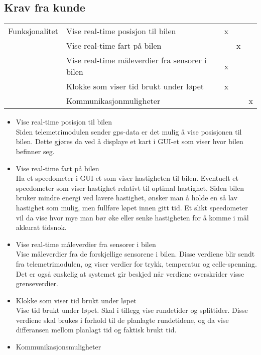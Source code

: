 \subsection{Krav fra kunde}
\begin{tabular}{|r|l|l|l|l|} 
    \hline 
        Funksjonalitet  & Vise real-time posisjon til bilen & x &   & \\ \cline{2-5} 
                & Vise real-time fart på bilen &  & x  & \\ \cline{2-5} 
                & Vise real-time måleverdier fra sensorer i bilen & x &   & \\ \cline{2-5} 
                & Klokke som viser tid brukt under løpet   &  x &  & \\ \cline{2-5} 
                & Kommunikasjonmuligheter &  &   & x \\ \cline{2-5} 
         \end{tabular}
\begin{itemize}
\item Vise real-time posisjon til bilen \\
Siden telemetrimodulen sender gps-data er det mulig  å vise posisjonen til bilen. Dette gjøres da ved å displaye et kart i GUI-et som viser hvor bilen befinner seg.
\item Vise real-time fart på bilen \\
Ha et speedometer i GUI-et som viser hastigheten til bilen. Eventuelt et speedometer som viser hastighet relativt til optimal hastighet. Siden bilen bruker mindre energi ved lavere hastighet, ønsker man å holde en så lav hastighet som mulig, men fullføre løpet innen gitt tid. Et slikt speedometer vil da vise hvor mye man bør øke eller senke hastigheten for å komme i mål akkurat tidsnok.
\item  Vise real-time måleverdier fra sensorer i bilen \\
Vise måleverdier fra de forskjellige sensorene i bilen. Disse verdiene blir sendt fra telemetrimodulen, og viser verdier for trykk, temperatur og celle-spenning. Det er også ønskelig at systemet gir beskjed når verdiene overskrider visse grenseverdier. 
\item Klokke som viser tid brukt under løpet \\
Vise tid brukt under løpet. Skal i tillegg vise rundetider og splittider. Disse verdiene skal brukes i forhold til de planlagte rundetidene, og da vise differansen mellom planlagt tid og faktisk brukt tid. 
\item Kommunikasjonsmuligheter \\
\end{itemize}